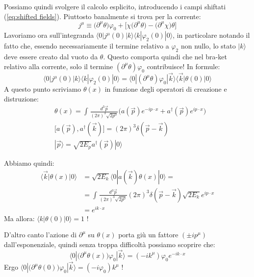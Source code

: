 \documentclass[../main.tex]{subfiles}
\begin{document}
\begin{exercise}
    Possiamo quindi svolgere il calcolo esplicito, introducendo i campi shiftati (\ref{eq:shifted fields}). Piuttosto banalmente si trova per la corrente:
    \[
    j^\mu \equiv \big(\partial^\mu\theta\big)\varphi_0 + \big[\chi \big(\partial^\mu\theta\big) -\big(\partial^\mu\chi\big)\theta\big]
    \]
    Lavoriamo ora sull'integranda $\langle 0|j^\mu(0) |k\rangle\langle k| \varphi_2(0)|0\rangle $, in particolare notando il fatto che, essendo necessariamente il termine relativo a $\varphi_2$ non nullo, lo stato $|k\rangle$ deve essere creato dal vuoto da $\theta$. Questo comporta quindi che nel bra-ket relativo alla corrente, solo il termine $(\partial^\mu\theta)\varphi_0$ contribuisce! In formule:
    \[
    \langle 0|j^\mu(0) |k\rangle\langle k| \varphi_2(0)|0\rangle = \langle 0|(\partial^\mu\theta)\varphi_0 |\Vec{k}\rangle\langle \Vec{k}| \theta(0)|0\rangle
    \]
    A questo punto scriviamo $\theta(x)$ in funzione degli operatori di creazione e distruzione:
    \begin{align*}
        &\theta(x) = \int_{}\frac{d^3\Vec{p}}{(2\pi)^3\sqrt{2p^0}} \Big(a(\Vec{p})e^{-ip\cdot x} +a^\dagger(\Vec{p})e^{ip\cdot x}\Big)\\
        &\big[a(\Vec{p}), a^\dagger(\Vec{k})\big] = (2\pi)^3\delta(\Vec{p} -\Vec{k}) \\
        &|\Vec{p}\rangle = \sqrt{2E_p}a^\dagger(\Vec{p})|0\rangle
    \end{align*}

    Abbiamo quindi:
    \begin{align*}
        \langle \Vec{k}| \theta(x)|0\rangle &=\sqrt{2E_k}\langle 0|a(\Vec{k}) \theta(x)|0\rangle =\\
        &=\int_{}\frac{d^3\Vec{p}}{(2\pi)^3\sqrt{2p^0}}(2\pi)^3\delta(\Vec{p} -\Vec{k})\sqrt{2E_k}e^{ip\cdot x}\\
        &=e^{ik\cdot x}
    \end{align*}
    Ma allora: \( \boxed{\langle k| \theta(0)|0\rangle = 1}\) !

    D'altro canto l'azione di $\partial^\mu$ su $\theta(x)$ porta giù un fattore $(\pm ip^\mu)$ dall'esponenziale, quindi senza troppa difficoltà possiamo scoprire che:
    \[\langle 0|\big(\partial^\mu\theta(x)\big)\varphi_0|\Vec{k}\rangle = (-ik^\mu)\varphi_0e^{-ik\cdot x}\]
    Ergo $\boxed{\langle 0|\big(\partial^\mu\theta(0)\big)\varphi_0|\Vec{k}\rangle = (-i\varphi_0)k^\mu}$ !


\end{exercise}
\end{document}
